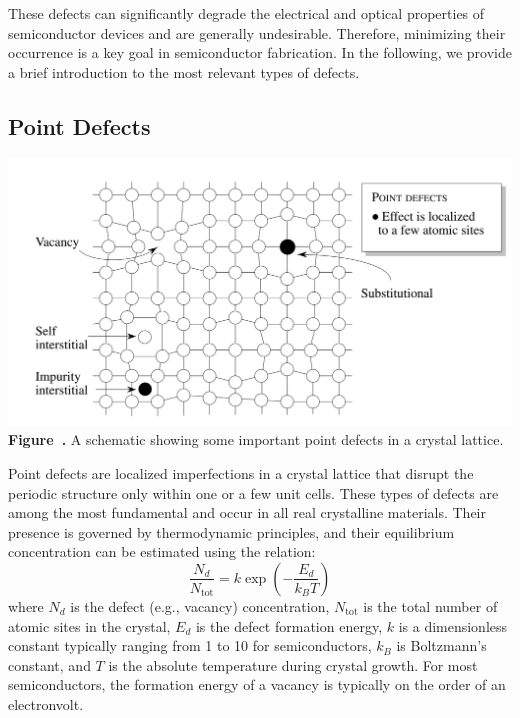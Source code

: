 These defects can significantly degrade the electrical and optical properties of semiconductor devices and are generally undesirable. Therefore, minimizing their occurrence is a key goal in semiconductor fabrication. In the following, we provide a brief introduction to the most relevant types of defects.

\subsection{Point Defects}
\begin{center}
	\begin{minipage}{0.9\textwidth}
		\centering
		\includegraphics[width=\textwidth]{img/point_defects.png}
		\\[0.5em]
		\textbf{Figure~\thefigure.} A schematic showing some important point defects in a crystal lattice.
		\label{fig:point_defects}
	\end{minipage}
\end{center}
Point defects are localized imperfections in a crystal lattice that disrupt the periodic structure only within one or a few unit cells. These types of defects are among the most fundamental and occur in all real crystalline materials. Their presence is governed by thermodynamic principles, and their equilibrium concentration can be estimated using the relation:
\begin{equation*}
	\frac{N_d}{N_\text{tot}} = k \exp\left( -\frac{E_d}{k_B T} \right)
\end{equation*}
where $N_d$ is the defect (e.g., vacancy) concentration, $N_\text{tot}$ is the total number of atomic sites in the crystal, $E_d$ is the defect formation energy, $k$ is a dimensionless constant typically ranging from 1 to 10 for semiconductors, $k_B$ is Boltzmann’s constant, and $T$ is the absolute temperature during crystal growth. For most semiconductors, the formation energy of a vacancy is typically on the order of an electronvolt.

